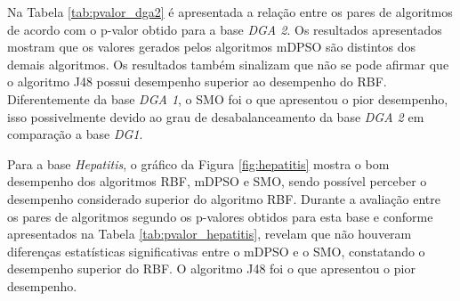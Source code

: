 \documentclass[
	12pt,				%
	openany,			%
	oneside,	
	a4paper,			%
	brazil,				%
	]{unimontes-ppgmsc-abntex2}
\begin{document}
Na Tabela \ref{tab:pvalor_dga2} é apresentada a relação entre os pares de algoritmos de acordo com o p-valor obtido para a base {\em DGA 2}. Os resultados apresentados mostram que os valores gerados pelos algoritmos mDPSO são distintos dos demais algoritmos. Os resultados também sinalizam que não se pode afirmar que o algoritmo J48 possui desempenho superior ao desempenho do RBF. Diferentemente da base {\em DGA 1}, o SMO foi o que apresentou o pior desempenho, isso possivelmente devido ao grau de desabalanceamento da base {\em DGA 2} em comparação a base {\em DG1}.

\begin{table}[!ht]
\setlength{\arrayrulewidth}{.2em}
\vspace{12pt}
\centering{}
\caption{p-valor medido para o produto da sensibilidade $\times$ especificidade global de cada algoritmo na base de dados {\em DGA 2} global.}
\label{tab:pvalor_dga2}
\end{table}

Para a base {\em Hepatitis}, o gráfico da Figura \ref{fig:hepatitis} mostra o bom desempenho dos algoritmos RBF, mDPSO e SMO, sendo possível perceber o desempenho considerado superior do algoritmo RBF. Durante a avaliação entre os pares de algoritmos segundo os p-valores obtidos para esta base e conforme apresentados na Tabela \ref{tab:pvalor_hepatitis}, revelam que não houveram diferenças estatísticas significativas entre o mDPSO e o SMO, constatando o desempenho superior do RBF. O algoritmo J48 foi o que apresentou o pior desempenho.
\end{document}
